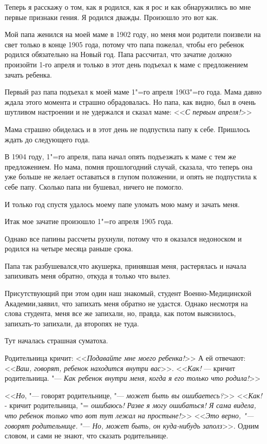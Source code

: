 
    Теперь  я расскажу о том, как я родился,
как я рос и как  обнаружились во мне  первые
признаки гения. Я родился дважды.  Произошло
это вот как.

    Мой папа женился на моей маме в 1902 году,  но  меня  мои родители поизвели на свет
только в конце 1905 года,  потому  что  папа
пожелал, чтобы его  ребенок родился обязательно на Новый год. Папа рассчитал, что зачатие должно произойти 1-го апреля и  только в
этот день подъехал к маме с предложением зачать ребенка.

    Первый раз папа подъехал  к моей маме 1"=го  апреля  1903"=го  года.  Мама давно ждала
этого  момента и  страшно  обрадовалась.  Но
папа, как видно, был в  очень  шутливом  настроении  и  не  удержался и сказал маме: <<\textit{С
первым апреля!}>>

    Мама страшно обиделась и в этот  день не
подпустила  папу  к себе.  Пришлось ждать до
следующего года.

    В  1904  году,  1"=го  апреля, папа начал
опять подъезжать к маме с тем же предложением. Но мама, помня прошлогодний случай, сказала, что теперь она уже  больше  не  желает
оставаться в глупом положении,  и  опять  не
подпустила к себе папу.  Сколько папа ни бушевал, ничего не помогло.

    И только год спустя  удалось  моему папе
уломать мою маму и зачать меня.

    Итак мое  зачатие  произошло 1"=го апреля
1905 года.

    Однако все папины рассчеты рухнули,  потому что я оказался  недоноском и родился на
четыре месяца раньше срока.

    Папа так разбушевался,что акушерка, принявшая меня, растерялась и начала запихивать
меня обратно, откуда я только что вылез.

    Присутствующий при этом один наш  знакомый, студент Военно-Медицинской Академии,заявил,  что запихать меня обратно не удастся.
Однако несмотря на слова студента, меня  все
же запихали, но,  правда, как потом  выяснилось, запихать-то  запихали, да второпях  не
туда.

    Тут началась страшная суматоха.
    
    Родительница кричит: <<\textit{Подавайте мне моего  ребенка!}>>  А ей отвечают:  <<\textit{Ваш,  говорят, ребенок находится  внутри вас}>>. <<\textit{Как!} ---
кричит родительница.  "---  \textit{Как  ребенок внутри
меня, когда я его только что родила!}>>

    <<\textit{Но},  "---  говорят  родительнице, "---  \textit{может
быть вы ошибаетесь?}>>  <<\textit{Как!} -  кричит  родительница, "= \textit{ошибаюсь!  Разве я могу ошибаться!  Я сама видела,  что ребенок  только что
вот тут лежал на простыне!}>>  <<\textit{Это  верно,  "---
говорят родительнице.} "--- \textit{Но,  может быть,  он
куда-нибудь заполз}>>.  Одним  словом,  и сами
не знают, что сказать родительнице.

